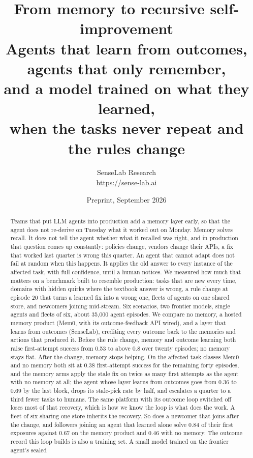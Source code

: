 \documentclass[11pt]{article}
\title{\vspace{-2.2em}\bfseries From memory to recursive self-improvement\\[0.2em]
\large Agents that learn from outcomes, agents that only remember,\\
and a model trained on what they learned,\\
when the tasks never repeat and the rules change}
\author{SenseLab Research\\[0.3em]\normalsize\url{https://sense-lab.ai}}
\date{Preprint, September 2026}
\begin{document}
\maketitle
\vspace{-1.2em}

\begin{abstract}
\noindent
Teams that put LLM agents into production add a memory layer early, so that the agent does
not re-derive on Tuesday what it worked out on Monday. Memory solves recall. It does not tell
the agent whether what it recalled was right, and in production that question comes up
constantly: policies change, vendors change their APIs, a fix that worked last quarter is wrong
this quarter. An agent that cannot adapt does not fail at random when this happens. It applies
the old answer to every instance of the affected task, with full confidence, until a human
notices. We measured how much that matters on a benchmark built to resemble production: tasks
that are new every time, domains with hidden quirks where the textbook answer is wrong, a rule
change at episode 20 that turns a learned fix into a wrong one, fleets of agents on one shared
store, and newcomers joining mid-stream. Six
scenarios, two frontier models, single agents and fleets of six, about 35{,}000 agent episodes.
We compare no memory, a hosted memory product (Mem0, with its outcome-feedback API wired), and
a layer that learns from outcomes (SenseLab), crediting every outcome back to the memories and
actions that produced it. Before the rule change, memory and outcome learning both raise
first-attempt success from 0.53 to above 0.8 over twenty episodes; no memory stays flat. After
the change, memory stops helping. On the affected task classes Mem0 and no memory both sit at
0.38 first-attempt success for the remaining forty episodes, and the memory arms apply the
stale fix on twice as many first attempts as the agent with no memory at all; the agent whose
layer learns from outcomes goes from 0.36 to 0.69 by the last block, drops its stale-pick rate
by half, and escalates a quarter to a third fewer tasks to humans. The same platform with its
outcome loop switched off loses most of that recovery, which is how we know the loop is what
does the work. A fleet of six sharing one store inherits the recovery. So does a newcomer that
joins after the change, and followers joining an agent that learned alone solve 0.84 of their
first exposures against 0.67 on the memory product and 0.46 with no memory. The outcome record
this loop builds is also a training set. A small model trained on the frontier agent's sealed

\end{abstract}
\end{document}
